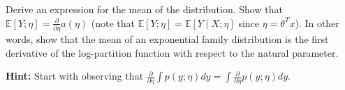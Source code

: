 \clearpage
\item {}
Derive an expression for the mean of the distribution. Show that
$\mathbb{E}[Y; \eta] = \frac{\partial}{\partial\eta}a(\eta)$ (note that
$\mathbb{E}[Y; \eta] = \mathbb{E}[Y\mid X; \eta]$ since $\eta = \theta^T x$).
In other words, show that the mean of an exponential family distribution is the
first derivative of the log-partition function with respect to the natural
parameter.

\textbf{Hint:} Start with observing that $\frac{\partial}{\partial \eta} \int
p(y;\eta) dy = \int \frac{\partial}{\partial \eta} p(y;\eta) dy$.

\ifnum{}\fi
